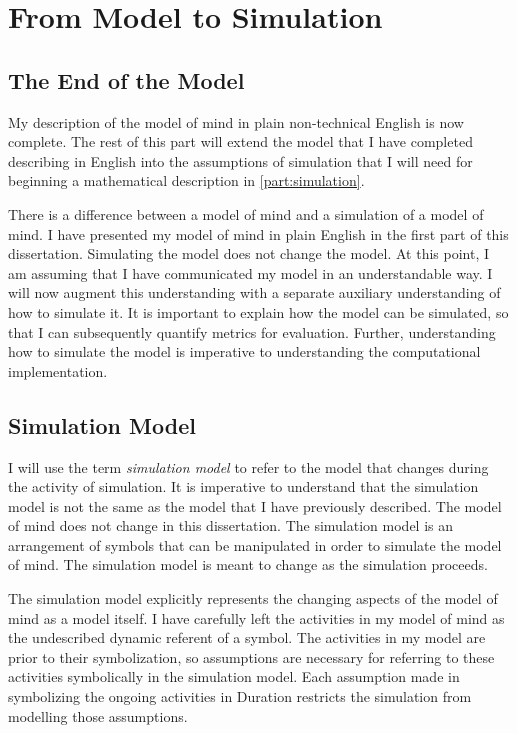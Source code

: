 \chapter{From Model to Simulation}
\label{chapter:from_model_to_simulation}

\section{The End of the Model}

My description of the model of mind in plain non-technical English is
now complete.  The rest of this part will extend the model that I have
completed describing in English into the assumptions of simulation
that I will need for beginning a mathematical description in
\autoref{part:simulation}.

There is a difference between a model of mind and a simulation of a
model of mind.  I have presented my model of mind in plain English in
the first part of this dissertation.  Simulating the model does not
change the model.  At this point, I am assuming that I have
communicated my model in an understandable way.  I will now augment
this understanding with a separate auxiliary understanding of how to
simulate it.  It is important to explain how the model can be
simulated, so that I can subsequently quantify metrics for evaluation.
Further, understanding how to simulate the model is imperative to
understanding the computational implementation.

\section{Simulation Model}

I will use the term \emph{simulation model} to refer to the model that
changes during the activity of simulation.  It is imperative to
understand that the simulation model is not the same as the model that
I have previously described.  The model of mind does not change in
this dissertation.  The simulation model is an arrangement of symbols
that can be manipulated in order to simulate the model of mind.  The
simulation model is meant to change as the simulation proceeds.

The simulation model explicitly represents the changing aspects of the
model of mind as a model itself.  I have carefully left the activities
in my model of mind as the undescribed dynamic referent of a symbol.
The activities in my model are prior to their symbolization, so
assumptions are necessary for referring to these activities
symbolically in the simulation model.  Each assumption made in
symbolizing the ongoing activities in Duration restricts the
simulation from modelling those assumptions.

